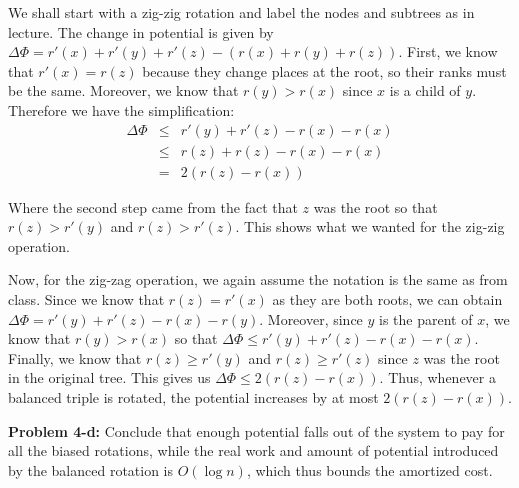 \documentclass[psamsfonts]{amsart}
\newenvironment{sol}{\vspace{0.25cm}{\large \bfseries Solution:}}{\qedsymbol}
\newenvironment{prob}[1]{\begin{framed}{\large \bfseries Problem #1:}}{\end{framed}}
\begin{document}
\begin{sol}
We shall start with a zig-zig rotation and label the nodes and subtrees as in lecture. The change in potential is given by $\Delta \Phi = r'(x) + r'(y) +r'(z) - (r(x) + r(y) + r(z))$. First, we know that $r'(x) = r(z)$ because they change places at the root, so their ranks must be the same. Moreover, we know that $r(y) > r(x)$ since $x$ is a child of $y$. Therefore we have the simplification:
\begin{eqnarray}
\Delta \Phi &\leq& r'(y) + r'(z) - r(x) - r(x) \\
 &\leq& r(z) + r(z) - r(x) - r(x) \\
 &=& 2(r(z) - r(x))
\end{eqnarray}

Where the second step came from the fact that $z$ was the root so that $r(z) > r'(y)$ and $r(z) > r'(z)$. This shows what we wanted for the zig-zig operation. 

Now, for the zig-zag operation, we again assume the notation is the same as from class. Since we know that $r(z) = r'(x)$ as they are both roots, we can obtain $\Delta \Phi = r'(y) + r'(z) - r(x) - r(y)$. Moreover, since $y$ is the parent of $x$, we know that $r(y) > r(x)$ so that $\Delta \Phi \leq r'(y) + r'(z) - r(x) - r(x)$. Finally, we know that $r(z) \geq r'(y)$ and $r(z) \geq r'(z)$ since $z$ was the root in the original tree. This gives us $\Delta \Phi \leq 2(r(z) - r(x))$. Thus, whenever a balanced triple is rotated, the potential increases by at most $2(r(z) - r(x))$. 
\end{sol}

\begin{prob}{4-d}
Conclude that enough potential falls out of the system to pay for all the biased rotations, while the real work and amount of potential introduced by the balanced rotation is $O(\log n)$, which thus bounds the amortized cost.
\end{prob}
\end{document}
